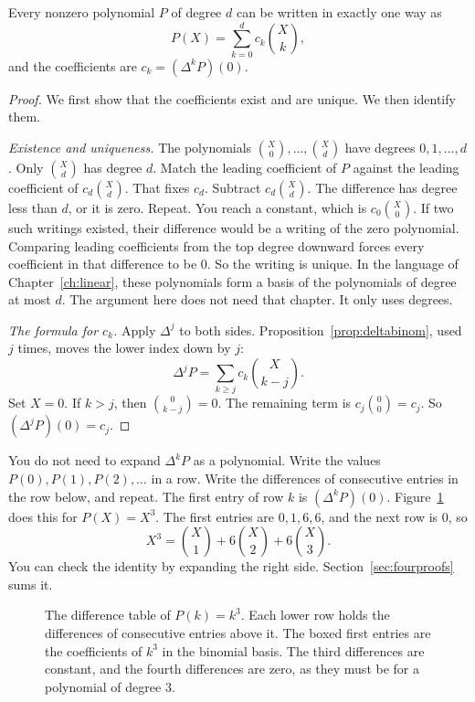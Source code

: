\begin{theorem}\label{thm:newton}
Every nonzero polynomial $P$ of degree $d$ can be written in exactly one way as
\[
P(X)=\sum_{k=0}^dc_k\binom Xk,
\]
and the coefficients are $c_k=(\Delta^kP)(0)$.
\end{theorem}
\begin{proof}
We first show that the coefficients exist and are unique. We then identify them.

\emph{Existence and uniqueness.} The polynomials $\binom X0,\dots,\binom Xd$ have degrees $0,1,\dots,d$. Only $\binom Xd$ has degree $d$. Match the leading coefficient of $P$ against the leading coefficient of $c_d\binom Xd$. That fixes $c_d$. Subtract $c_d\binom Xd$. The difference has degree less than $d$, or it is zero. Repeat. You reach a constant, which is $c_0\binom X0$. If two such writings existed, their difference would be a writing of the zero polynomial. Comparing leading coefficients from the top degree downward forces every coefficient in that difference to be $0$. So the writing is unique. In the language of Chapter~\ref{ch:linear}, these polynomials form a basis of the polynomials of degree at most $d$. The argument here does not need that chapter. It only uses degrees.

\emph{The formula for $c_k$.} Apply $\Delta^j$ to both sides. Proposition~\ref{prop:deltabinom}, used $j$ times, moves the lower index down by $j$:
\[
\Delta^jP=\sum_{k\ge j}c_k\binom X{k-j}.
\]
Set $X=0$. If $k>j$, then $\binom{0}{k-j}=0$. The remaining term is $c_j\binom00=c_j$. So $(\Delta^jP)(0)=c_j$.
\end{proof}

You do not need to expand $\Delta^kP$ as a polynomial. Write the values $P(0),P(1),P(2),\dots$ in a row. Write the differences of consecutive entries in the row below, and repeat. The first entry of row $k$ is $(\Delta^kP)(0)$. Figure~\ref{fig:differences} does this for $P(X)=X^3$. The first entries are $0,1,6,6$, and the next row is $0$, so
\[
X^3=\binom X1+6\binom X2+6\binom X3.
\]
You can check the identity by expanding the right side. Section~\ref{sec:fourproofs} sums it.

\begin{figure}[ht]
\centering
{}
\caption{The difference table of $P(k)=k^3$. Each lower row holds the differences of consecutive entries above it. The boxed first entries are the coefficients of $k^3$ in the binomial basis. The third differences are constant, and the fourth differences are zero, as they must be for a polynomial of degree $3$.}
\label{fig:differences}
\end{figure}

